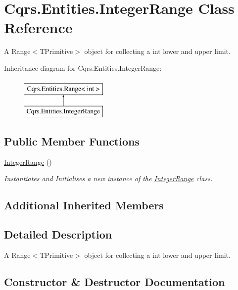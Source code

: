 \hypertarget{classCqrs_1_1Entities_1_1IntegerRange}{}\section{Cqrs.\+Entities.\+Integer\+Range Class Reference}
\label{classCqrs_1_1Entities_1_1IntegerRange}


A Range$<$\+T\+Primitive$>$ object for collecting a int lower and upper limit.  


Inheritance diagram for Cqrs.\+Entities.\+Integer\+Range\+:\begin{figure}[H]
\begin{center}
\leavevmode
\includegraphics[height=2.000000cm]{classCqrs_1_1Entities_1_1IntegerRange}
\end{center}
\end{figure}
\subsection*{Public Member Functions}
\begin{DoxyCompactItemize}
\item 
\hyperlink{classCqrs_1_1Entities_1_1IntegerRange_ac491ceda1f36d73025011d79e56d77d3}{Integer\+Range} ()
\begin{DoxyCompactList}\small\item\em Instantiates and Initialises a new instance of the \hyperlink{classCqrs_1_1Entities_1_1IntegerRange}{Integer\+Range} class. \end{DoxyCompactList}\end{DoxyCompactItemize}
\subsection*{Additional Inherited Members}


\subsection{Detailed Description}
A Range$<$\+T\+Primitive$>$ object for collecting a int lower and upper limit. 



\subsection{Constructor \& Destructor Documentation}
\mbox{\label{classCqrs_1_1Entities_1_1IntegerRange_ac491ceda1f36d73025011d79e56d77d3}} 
